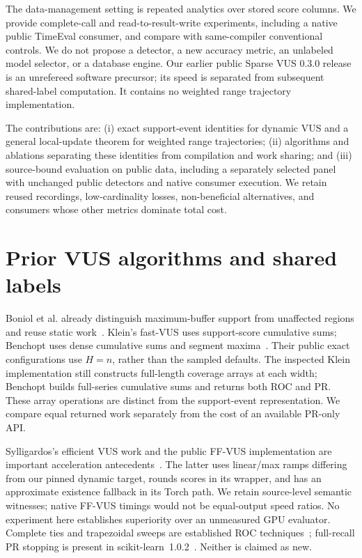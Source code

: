 The data-management setting is repeated analytics over stored score columns.
We provide complete-call and read-to-result-write experiments, including a
native public TimeEval consumer, and compare with same-compiler conventional
controls. We do not propose a detector, a new accuracy metric, an unlabeled
model selector, or a database engine. Our earlier public Sparse VUS 0.3.0
release~\cite{sparsevus03} is an unrefereed software precursor; its speed is
separated from subsequent shared-label computation. It contains no weighted
range trajectory implementation.

The contributions are: (i) exact support-event identities for dynamic VUS and
a general local-update theorem for weighted range trajectories; (ii) algorithms
and ablations separating these identities from compilation and work sharing;
and (iii) source-bound evaluation on public data, including a separately
selected panel with unchanged public detectors and native consumer execution.
We retain reused recordings, low-cardinality losses, non-beneficial alternatives,
and consumers whose other metrics dominate total cost.



\section{Prior VUS algorithms and shared labels}
Boniol et al. already distinguish maximum-buffer support from unaffected
regions and reuse static work~\cite{boniol2025}. Klein's fast-VUS uses
support-score cumulative sums; Benchopt uses dense cumulative sums and segment
maxima~\cite{klein2026,benchopt2026}. Their public exact configurations use
$H=n$, rather than the sampled defaults. The inspected Klein implementation
still constructs full-length coverage arrays at each width; Benchopt builds
full-series cumulative sums and returns both ROC and PR. These array operations
are distinct from the support-event representation. We compare equal returned
work separately from the cost of an available PR-only API.

Sylligardos's efficient VUS work and the public FF-VUS implementation are
important acceleration antecedents~\cite{sylligardos2025,ffvus2026}. The latter
uses linear/max ramps differing from our pinned dynamic target, rounds scores
in its wrapper, and has an approximate existence fallback in its Torch path.
We retain source-level semantic witnesses; native FF-VUS timings would not be
equal-output speed ratios. No experiment here establishes superiority over an
unmeasured GPU evaluator. Complete ties and trapezoidal sweeps are established
ROC techniques~\cite{fawcett2006}; full-recall PR stopping is present in
scikit-learn~1.0.2~\cite{sklearn102}. Neither is claimed as new.

